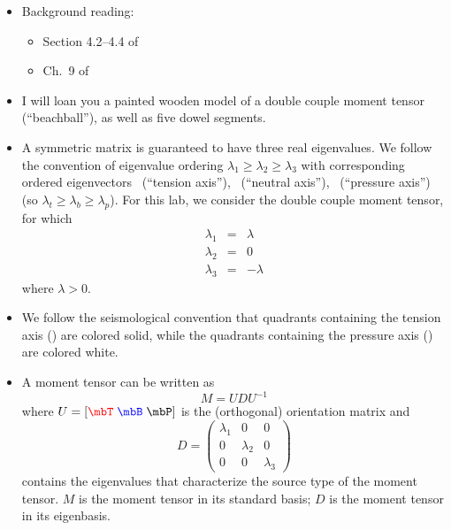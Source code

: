 \documentclass[11pt,titlepage,fleqn]{article}
\newcommand{\fvect}{\textcolor{red}{\mbT}}
\newcommand{\fvecb}{\textcolor{blue}{\mbB}}
\newcommand{\fvecp}{\textcolor{black}{\mbP}}
\begin{document}
\begin{itemize}

\item Background reading:
%
\begin{itemize}
\item Section 4.2--4.4 of \citet{SteinWysession}
\item Ch.~9 of \citet{ShearerE2}
\end{itemize}

\item I will loan you a painted wooden model of a double couple moment tensor (``beachball''), as well as five dowel segments.

\item A symmetric matrix is guaranteed to have three real eigenvalues. We follow the convention of eigenvalue ordering $\lambda_1 \ge \lambda_2 \ge \lambda_3$ with corresponding ordered eigenvectors \fvect\ (``tension axis''), \fvecb\ (``neutral axis''), \fvecp\ (``pressure axis'') (so $\lambda_t \ge \lambda_b \ge \lambda_p$). For this lab, we consider the double couple moment tensor, for which
%
\begin{eqnarray*}
\lambda_1 &=& \lambda
\\
\lambda_2 &=& 0
\\
\lambda_3 &=& -\lambda
\end{eqnarray*}
%
where $\lambda > 0$.

\item We follow the seismological convention that quadrants containing the tension axis (\fvect) are colored solid, while the quadrants containing the pressure axis (\fvecp) are colored white.

\item A moment tensor can be written as \citep[][eq.~1]{TapeTape2012beach}
%
\begin{equation}
M = U D U^{-1}
\end{equation}
%
where $U = [\fvect\; \fvecb \; \fvecp]$ is the (orthogonal) orientation matrix and 
%
\begin{equation}
D = \begin{pmatrix} \lambda_1 & 0 & 0 \\ 0 & \lambda_2 & 0 \\ 0 & 0 & \lambda_3 \end{pmatrix}
\end{equation}
%
contains the eigenvalues that characterize the source type of the moment tensor. $M$ is the moment tensor in its standard basis; $D$ is the moment tensor in its eigenbasis.

\end{itemize}
\end{document}
